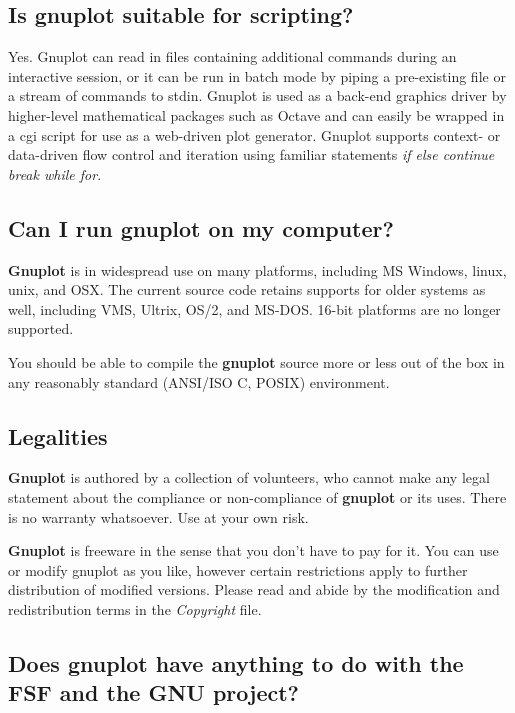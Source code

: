 \documentclass[a4paper,11pt]{article}
\newcommand{\gnuplot}{\textbf{gnuplot }}
\newcommand{\Gnuplot}{\textbf{Gnuplot }}
\begin{document}
\subsection{Is \gnuplot suitable for scripting?}

Yes. Gnuplot can read in files containing additional commands during
an interactive session, or it can be run in batch mode by piping a
pre-existing file or a stream of commands to stdin. Gnuplot is used
as a back-end graphics driver by higher-level mathematical packages
such as Octave and can easily be wrapped in a cgi script for use as a
web-driven plot generator.  Gnuplot supports context- or data-driven
flow control and iteration using familiar statements
{\em if else continue break while for}.


\subsection{Can I run \gnuplot on my computer?}

\Gnuplot{} is in widespread use on many platforms, including
MS Windows, linux, unix, and OSX.  The current source code retains
supports for older systems as well, including VMS, Ultrix, OS/2, and
MS-DOS. 16-bit platforms are no longer supported.

You should be able to compile the \gnuplot source more or
less out of the box in any reasonably standard (ANSI/ISO C, POSIX)
environment.


\subsection{Legalities}

\Gnuplot{} is authored by a collection of volunteers, who cannot
make any legal statement about the compliance or non-compliance of
\gnuplot or its uses. There is no warranty whatsoever. Use at your own risk.

\Gnuplot{} is freeware in the sense that you don't have to pay for it.
You can use or modify gnuplot as you like, however certain restrictions
apply to further distribution of modified versions.
Please read and abide by the modification and redistribution terms in
the \textit{Copyright} file.

\subsection{Does \gnuplot have anything to do with the FSF and the GNU
project?}
\end{document}
